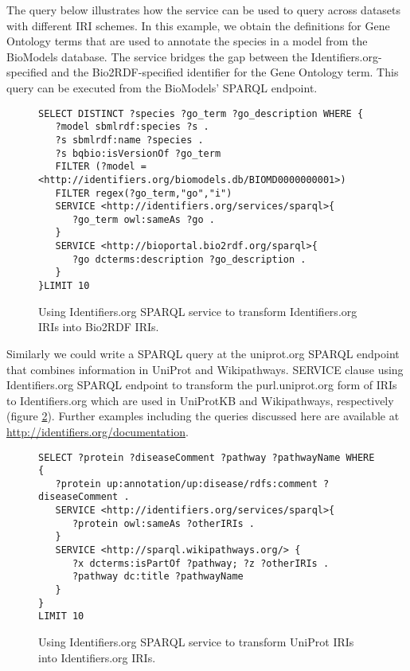 \documentclass{bioinfo}
\begin{document}
The query below illustrates how the service can be used to query across datasets with different IRI schemes. In this example, we obtain the definitions for Gene Ontology terms that are used to annotate the species in a model from the BioModels database. The service bridges the gap between the Identifiers.org-specified and the Bio2RDF-specified identifier for the Gene Ontology term. This query can be executed from the BioModels' SPARQL endpoint.

\begin{figure}[h]
{\scriptsize
\begin{verbatim}
SELECT DISTINCT ?species ?go_term ?go_description WHERE {
   ?model sbmlrdf:species ?s . 
   ?s sbmlrdf:name ?species .
   ?s bqbio:isVersionOf ?go_term 
   FILTER (?model = <http://identifiers.org/biomodels.db/BIOMD0000000001>)
   FILTER regex(?go_term,"go","i")
   SERVICE <http://identifiers.org/services/sparql>{
      ?go_term owl:sameAs ?go .
   }
   SERVICE <http://bioportal.bio2rdf.org/sparql>{
      ?go dcterms:description ?go_description .
   }
}LIMIT 10
\end{verbatim}
}
\caption{Using Identifiers.org SPARQL service to transform Identifiers.org IRIs into Bio2RDF IRIs.}
\label{example1}
\end{figure}

Similarly we could write a SPARQL query at the uniprot.org SPARQL endpoint that combines information in UniProt and Wikipathways. SERVICE clause using Identifiers.org SPARQL endpoint to transform the purl.uniprot.org form of IRIs to Identifiers.org which are used in UniProtKB and Wikipathways, respectively (figure \ref{example2}). Further examples including the queries discussed here are available at \href{http://identifiers.org/documentation}{http://identifiers.org/documentation}.

\begin{figure}[h]
{\scriptsize
\begin{verbatim}		
SELECT ?protein ?diseaseComment ?pathway ?pathwayName WHERE {
   ?protein up:annotation/up:disease/rdfs:comment ?diseaseComment .
   SERVICE <http://identifiers.org/services/sparql>{
      ?protein owl:sameAs ?otherIRIs .
   }
   SERVICE <http://sparql.wikipathways.org/> {
      ?x dcterms:isPartOf ?pathway; ?z ?otherIRIs .
      ?pathway dc:title ?pathwayName
   }
}
LIMIT 10
\end{verbatim}
}
\caption{Using Identifiers.org SPARQL service to transform UniProt IRIs into Identifiers.org IRIs.}
\label{example2}
\end{figure}
    
\end{document}
